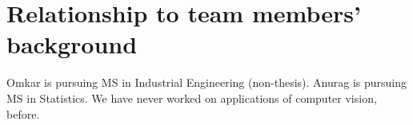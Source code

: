 \section{Relationship to team members' background}
Omkar is pursuing MS in Industrial Engineering (non-thesis). Anurag is pursuing MS in Statistics. We have never worked on applications of computer vision, before. 






